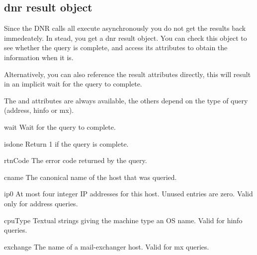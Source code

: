 \subsection{dnr result object}

Since the DNR calls all execute asynchronously you do not get the
results back immedeately. In stead, you get a dnr result object. You
can check this object to see whether the query is complete, and access
its attributes to obtain the information when it is.

Alternatively, you can also reference the result attributes directly,
this will result in an implicit wait for the query to complete.

The  and  attributes are always available, the
others depend on the type of query (address, hinfo or mx).

\renewcommand{\indexsubitem}{(dnr result object method)}

\begin{funcdesc}{wait}{}
Wait for the query to complete.
\end{funcdesc}

\begin{funcdesc}{isdone}{}
Return 1 if the query is complete.
\end{funcdesc}

\renewcommand{\indexsubitem}{(dnr result object attribute)}

\begin{datadesc}{rtnCode}
The error code returned by the query.
\end{datadesc}

\begin{datadesc}{cname}
The canonical name of the host that was queried.
\end{datadesc}

\begin{datadesc}{ip0}
At most four integer IP addresses for this host. Unused entries are
zero. Valid only for address queries.
\end{datadesc}

\begin{datadesc}{cpuType}
Textual strings giving the machine type an OS name. Valid for hinfo
queries.
\end{datadesc}

\begin{datadesc}{exchange}
The name of a mail-exchanger host. Valid for mx queries.
\end{datadesc}

